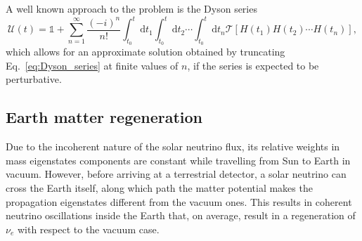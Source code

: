 \documentclass[11pt,a4paper]{article}
\newcommand{\de}[0]{\text{d}}
\begin{document}
A well known approach to the problem is the Dyson series 
\begin{equation}
	\mathcal{U}(t) = \mathbb{1} + \sum_{n=1}^\infty \frac{\left(-i\right)^n}{n!} \int_{t_0}^t \de t_1 \int_{t_0}^t \de t_2 \cdots \int_{t_0}^t \de t_n \mathcal{T} \left[H(t_1) H(t_2) \cdots H(t_n) \right], \label{eq:Dyson_series}
\end{equation}
which allows for an approximate solution obtained by truncating Eq.~\ref{eq:Dyson_series} at finite values of $n$, if the series is expected to be perturbative. 
%
%

\subsection{Earth matter regeneration}
Due to the incoherent nature of the solar neutrino flux, its relative weights in mass eigenstates components are constant while travelling from Sun to Earth in vacuum. However, before arriving at a terrestrial detector, a solar neutrino can cross the Earth itself, along which path the matter potential makes the propagation eigenstates different from the vacuum ones. This results in coherent neutrino oscillations inside the Earth that, on average, result in a regeneration of $\nu_e$ with respect to the vacuum case.
\end{document}
